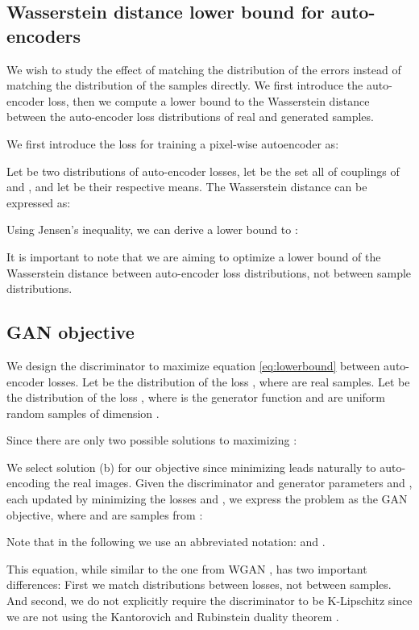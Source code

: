 \documentclass[english]{article}
\begin{document}
\subsection{Wasserstein distance lower bound for auto-encoders}

We wish to study the effect of matching the distribution of the errors
instead of matching the distribution of the samples directly. We first
introduce the auto-encoder loss, then we compute a lower bound to
the Wasserstein distance between the auto-encoder loss distributions
of real and generated samples. 

We first introduce the
loss for training a pixel-wise autoencoder as:




Let  be two distributions of auto-encoder losses, let
 be the set all of couplings of 
and , and let  be their respective
means. The Wasserstein distance can be expressed as:


 Using Jensen's inequality, we can derive a lower bound to :




It is important to note that we are aiming to optimize a lower bound
of the Wasserstein distance between auto-encoder loss distributions,
not between sample distributions. 


\subsection{GAN objective}

We design the discriminator to maximize equation \ref{eq:lowerbound}
between auto-encoder losses. Let  be the distribution of
the loss , where  are real samples. Let 
be the distribution of the loss , where 
is the generator function and  are uniform random
samples of dimension .

Since  there are only two possible
solutions to maximizing :




We select solution (b) for our objective since minimizing 
leads naturally to auto-encoding the real images. Given the discriminator
and generator parameters  and , each updated
by minimizing the losses  and ,
we express the problem as the GAN objective, where  and 
are samples from :




Note that in the following we use an abbreviated notation: 
and .

This equation, while similar to the one from WGAN \cite{arjovsky2017wasserstein},
has two important differences: First we match distributions between
losses, not between samples. And second, we do not explicitly require
the discriminator to be K-Lipschitz since we are not using the Kantorovich
and Rubinstein duality theorem \cite{villani2008optimal}.
\end{document}
